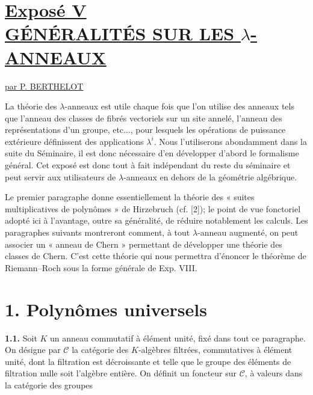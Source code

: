 \renewcommand{\parf}{\operatorname{parf}}
\section*{\underline{Exposé V}\\[3pt] \underline{\underline{GÉNÉRALITÉS SUR LES \(\lambda\)-ANNEAUX}}}
\begin{center}
\underline{par P. BERTHELOT}
\end{center}

La théorie des \(\lambda\)-anneaux est utile chaque fois que l'on utilise des anneaux tels que l'anneau des classes de fibrés vectoriels sur un site annelé, l'anneau des représentations d'un groupe, etc..., pour lesquels les opérations de puissance extérieure définissent des applications \(\lambda^i\). Nous l'utiliserons abondamment dans la suite du Séminaire, il est donc nécessaire d'en développer d'abord le formalisme général. Cet exposé est donc tout à fait indépendant du reste du séminaire et peut servir aux utilisateurs de \(\lambda\)-anneaux en dehors de la géométrie algébrique.

Le premier paragraphe donne essentiellement la théorie des « suites multiplicatives de polynômes » de Hirzebruch (cf. [2]); le point de vue fonctoriel adopté ici à l'avantage, outre sa généralité, de réduire notablement les calculs. Les paragraphes suivants montreront comment, à tout \(\lambda\)-anneau augmenté, on peut associer un « anneau de Chern » permettant de développer une théorie des classes de Chern. C'est cette théorie qui nous permettra d'énoncer le théorème de Riemann--Roch sous la forme générale de Exp. VIII.

\section*{1. Polynômes universels}

\textbf{1.1.} Soit \(K\) un anneau commutatif à élément unité, fixé dans tout ce paragraphe. On désigne par \(\mathcal C\) la catégorie des \(K\)-algèbres filtrées, commutatives à élément unité, dont la filtration est décroissante et telle que le groupe des éléments de filtration nulle soit l'algèbre entière. On définit un foncteur sur \(\mathcal C\), à valeurs dans la catégorie des groupes 
